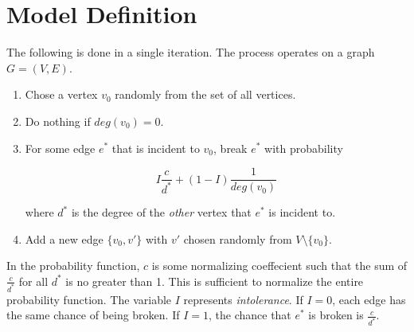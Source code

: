 \documentclass[a4paper,10pt]{article}
\title{}
\author{}
\begin{document}
\section{Model Definition}

The following is done in a single iteration. The process operates on a graph $G = (V, E)$.

\begin{enumerate}
 \item Chose a vertex $v_0$ randomly from the set of all vertices. 
 \item Do nothing if $deg(v_0) = 0$. 
 \item For some edge $e^*$ that is incident to $v_0$, break $e^*$ with probability

 \begin{equation}
  I \frac{c}{d^*} + (1 - I)\frac{1}{deg(v_0)}
 \end{equation}

where $d^*$ is the degree of the \emph{other} vertex that $e^*$ is incident to. 

 \item Add a new edge $\{v_0, v'\}$ with $v'$ chosen randomly from $V \setminus \{v_0\}$.

\end{enumerate}

In the probability function, $c$ is some normalizing coeffecient such that the sum of $\frac{c}{d^*}$ for all $d^*$ is no greater than 1. This is sufficient to normalize the entire probability function. The variable $I$ represents \emph{intolerance}. If $I = 0$, each edge has the same chance of being broken. If $I = 1$, the chance that $e^*$ is broken is $\frac{c}{d^*}$.
\end{document}

